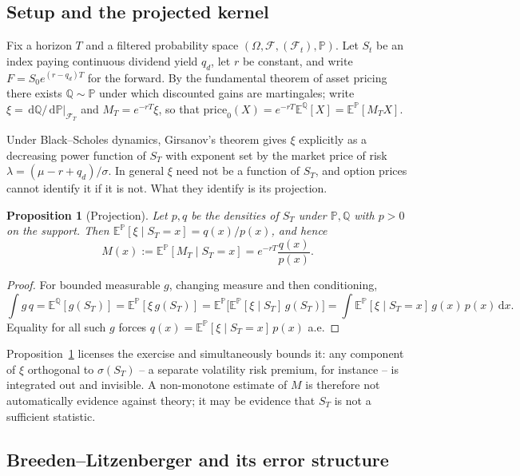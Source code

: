 \documentclass[11pt,a4paper]{article}
\newtheorem{proposition}[theorem]{Proposition}
\theoremstyle{remark}
\newcommand{\Q}{\mathbb{Q}}
\newcommand{\PP}{\mathbb{P}}
\newcommand{\E}{\mathbb{E}}
\newcommand{\Filt}{\mathcal{F}}
\newcommand{\dd}{\,\mathrm{d}}
\begin{document}
\subsection{Setup and the projected kernel}

Fix a horizon $T$ and a filtered probability space
$(\Omega,\Filt,(\Filt_t),\PP)$. Let $S_t$ be an index paying continuous
dividend yield $q_d$, let $r$ be constant, and write $F = S_0 e^{(r-q_d)T}$ for
the forward. By the fundamental theorem of asset pricing there exists
$\Q\sim\PP$ under which discounted gains are martingales; write
$\xi = \dd\Q/\dd\PP|_{\Filt_T}$ and $M_T = e^{-rT}\xi$, so that
$\text{price}_0(X) = e^{-rT}\E^\Q[X] = \E^\PP[M_T X]$.

Under Black--Scholes dynamics, Girsanov's theorem gives $\xi$ explicitly as a
decreasing power function of $S_T$ with exponent set by the market price of
risk $\lambda = (\mu - r + q_d)/\sigma$. In general $\xi$ need not be a function
of $S_T$, and option prices cannot identify it if it is not. What they identify
is its projection.

\begin{proposition}[Projection]
\label{prop:projection}
Let $p,q$ be the densities of $S_T$ under $\PP,\Q$ with $p>0$ on the support.
Then $\E^\PP[\xi\mid S_T = x] = q(x)/p(x)$, and hence
\begin{equation}
\label{eq:kernel}
M(x) := \E^\PP[M_T \mid S_T = x] = e^{-rT}\frac{q(x)}{p(x)}.
\end{equation}
\end{proposition}

\begin{proof}
For bounded measurable $g$, changing measure and then conditioning,
\[
\int g\,q
= \E^\Q[g(S_T)]
= \E^\PP[\xi\,g(S_T)]
= \E^\PP\big[\E^\PP[\xi\mid S_T]\,g(S_T)\big]
= \int \E^\PP[\xi\mid S_T = x]\,g(x)\,p(x)\dd x .
\]
Equality for all such $g$ forces $q(x) = \E^\PP[\xi\mid S_T=x]\,p(x)$ a.e.
\end{proof}

Proposition~\ref{prop:projection} licenses the exercise and simultaneously
bounds it: any component of $\xi$ orthogonal to $\sigma(S_T)$ -- a separate
volatility risk premium, for instance -- is integrated out and invisible. A
non-monotone estimate of $M$ is therefore not automatically evidence against
theory; it may be evidence that $S_T$ is not a sufficient statistic.

\subsection{Breeden--Litzenberger and its error structure}
\end{document}
